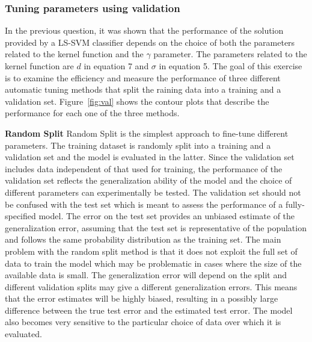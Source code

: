 \documentclass[conference,compsoc]{IEEEtran}
\begin{document}
 
\subsubsection{Tuning parameters using validation}


In the previous question, it was shown that the performance of the solution provided by a LS-SVM classifier depends on the choice of both the parameters related to the kernel function and the $\gamma$ parameter. The parameters related to the kernel function are $d$ in equation 7 and $\sigma$ in equation 5. The goal of this exercise is to examine the efficiency and measure the performance of three different automatic tuning methods that split the raining data into a training and a validation set. Figure~\ref{fig:val} shows the contour plots that describe the performance for each one of the three methods.

\textbf{Random Split} Random Split is the simplest approach to fine-tune different parameters. The training dataset is randomly split into a training and a validation set and the model is evaluated in the latter.
Since the validation set includes data independent of that used for training, the performance of the validation set reflects the generalization ability of the model and the choice of different parameters can experimentally be tested. The validation set should not be confused with the test set which is meant to assess the performance of a fully-specified model. The error on the test set provides an unbiased estimate of the generalization error, assuming that the test set is representative of the population and follows the same probability distribution as the training set. The main problem with the random split method is that it does not exploit the full set of data to train the model which may be problematic in cases where the size of the available data is small. The generalization error will depend on the split and different validation splits may give a different generalization errors. This means that the error estimates will be highly biased, resulting in a possibly large difference between the true test error and the estimated test error. The model also becomes very sensitive to the particular choice of data over which it is evaluated. 
\end{document}
